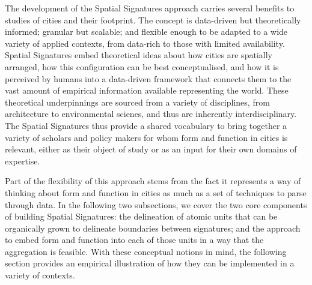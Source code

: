 The development of the Spatial Signatures approach carries several benefits
to studies of cities and their footprint.
The concept is data-driven but theoretically informed;
granular but scalable; and flexible enough to be adapted to a wide variety of
applied contexts, from data-rich to those with limited availability.
Spatial Signatures embed theoretical ideas about how cities are
spatially arranged, how this configuration can be best conceptualised, and how
it is perceived by humans into a data-driven framework that connects them to the
vast amount of empirical information available representing the world.
These theoretical underpinnings are sourced from a variety of disciplines,
from architecture to environmental scienes, and thus are inherently
interdisciplinary.
The Spatial Signatures thus provide a shared vocabulary to bring together a
variety of scholars and policy makers for whom form and function in cities is
relevant, either as their object of study or as an input for their own domains
of expertise.
 
Part of the flexibility of this approach stems from the fact it represents a
way of thinking about form and function in cities as much as a set of
techniques to parse through data.
%
In the following two subsections, we cover the two core components of building
Spatial Signatures: the delineation of atomic units that can be organically
grown to delineate boundaries between signatures; and the approach to embed
form and function into each of those units in a way that the aggregation is
feasible.
%
With these conceptual notions in mind, the following section provides an
empirical illustration of how they can be implemented in a variety of
contexts.




